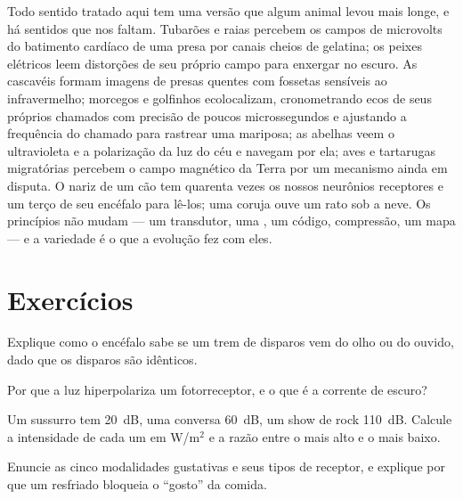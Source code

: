 \begin{remark}\label{rem:b3:sensory-systems:others}
Todo sentido tratado aqui tem uma versão que algum animal levou mais
longe, e há sentidos que nos faltam. Tubarões e raias percebem os campos
de microvolts do batimento cardíaco de uma presa por canais cheios de
gelatina; os peixes elétricos leem distorções de seu próprio campo para
enxergar no escuro. As cascavéis formam imagens de presas quentes com
fossetas sensíveis ao infravermelho; morcegos e golfinhos ecolocalizam,
cronometrando ecos de seus próprios chamados com precisão de poucos
microssegundos e ajustando a frequência do chamado para rastrear uma
mariposa; as abelhas veem o ultravioleta e a polarização da luz do céu e
navegam por ela; aves e tartarugas migratórias percebem o campo
magnético da Terra por um mecanismo ainda em disputa. O nariz de um cão
tem quarenta vezes os nossos neurônios receptores e um terço de seu
encéfalo para lê-los; uma coruja ouve um rato sob a neve. Os princípios
não mudam --- um transdutor, uma , um código, compressão,
um mapa --- e a variedade é o que a evolução fez com eles.
\end{remark}

\section{Exercícios}

\begin{exercise}[$\star$]\label{exo:b3:sensory-systems:1}
Explique como o encéfalo sabe se um trem de disparos vem do olho ou do
ouvido, dado que os disparos são idênticos.
\end{exercise}

\begin{exercise}[$\star$]\label{exo:b3:sensory-systems:2}
Por que a luz hiperpolariza um fotorreceptor, e o que é a corrente de
escuro?
\end{exercise}

\begin{exercise}[$\star$]\label{exo:b3:sensory-systems:3}
Um sussurro tem \qty{20}{dB}, uma conversa \qty{60}{dB}, um show de
rock \qty{110}{dB}. Calcule a intensidade de cada um em W/m$^{2}$ e a
razão entre o mais alto e o mais baixo.
\end{exercise}

\begin{exercise}[$\star$]\label{exo:b3:sensory-systems:4}
Enuncie as cinco modalidades gustativas e seus tipos de receptor, e
explique por que um resfriado bloqueia o ``gosto'' da comida.
\end{exercise}

